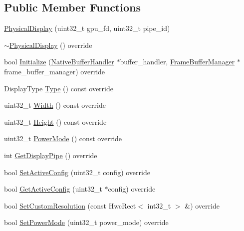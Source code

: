 \subsection*{Public Member Functions}
\begin{DoxyCompactItemize}
\item 
\mbox{\hyperlink{classhwcomposer_1_1PhysicalDisplay_af08453e7ec5a9f8e792063b09b2e9305}{Physical\+Display}} (uint32\+\_\+t gpu\+\_\+fd, uint32\+\_\+t pipe\+\_\+id)
\item 
\mbox{\hyperlink{classhwcomposer_1_1PhysicalDisplay_a06260ef1c571e04df545721406e94d7b}{$\sim$\+Physical\+Display}} () override
\item 
bool \mbox{\hyperlink{classhwcomposer_1_1PhysicalDisplay_a594319095f4b6c7078282c56d9cbe9f4}{Initialize}} (\mbox{\hyperlink{classhwcomposer_1_1NativeBufferHandler}{Native\+Buffer\+Handler}} $\ast$buffer\+\_\+handler, \mbox{\hyperlink{classhwcomposer_1_1FrameBufferManager}{Frame\+Buffer\+Manager}} $\ast$frame\+\_\+buffer\+\_\+manager) override
\item 
Display\+Type \mbox{\hyperlink{classhwcomposer_1_1PhysicalDisplay_aa2a50f9dbb2740cf40256bcadad666c4}{Type}} () const override
\item 
uint32\+\_\+t \mbox{\hyperlink{classhwcomposer_1_1PhysicalDisplay_a63c3f3123c8d148205e29c177bcd5bd6}{Width}} () const override
\item 
uint32\+\_\+t \mbox{\hyperlink{classhwcomposer_1_1PhysicalDisplay_aa6f009efb2eb6733c2476696b54c9461}{Height}} () const override
\item 
uint32\+\_\+t \mbox{\hyperlink{classhwcomposer_1_1PhysicalDisplay_a8339a14dbaa5ac9a1d4d4c3dc3694a10}{Power\+Mode}} () const override
\item 
int \mbox{\hyperlink{classhwcomposer_1_1PhysicalDisplay_a8bcd7d925e60afbea75bf3aa18b7aa75}{Get\+Display\+Pipe}} () override
\item 
bool \mbox{\hyperlink{classhwcomposer_1_1PhysicalDisplay_a1b2e31ee497b3fec8178abe481462560}{Set\+Active\+Config}} (uint32\+\_\+t config) override
\item 
bool \mbox{\hyperlink{classhwcomposer_1_1PhysicalDisplay_a6dfc5d017719115af233f12911c71d84}{Get\+Active\+Config}} (uint32\+\_\+t $\ast$config) override
\item 
bool \mbox{\hyperlink{classhwcomposer_1_1PhysicalDisplay_a8f67530a852d9e6e65874e4835b35dab}{Set\+Custom\+Resolution}} (const Hwc\+Rect$<$ int32\+\_\+t $>$ \&) override
\item 
bool \mbox{\hyperlink{classhwcomposer_1_1PhysicalDisplay_a4fc0fbe6c307de00cd10a3c998c74b51}{Set\+Power\+Mode}} (uint32\+\_\+t power\+\_\+mode) override

\end{DoxyCompactItemize}
